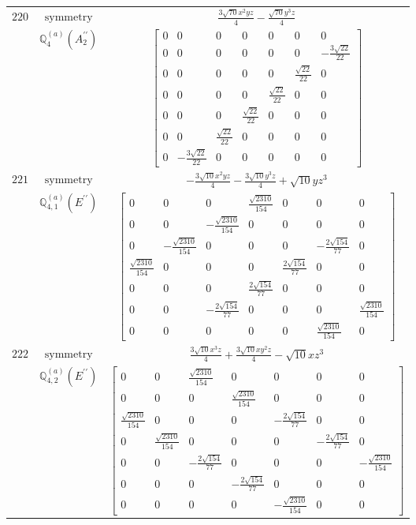 \documentclass[fleqn,8pt,landscape]{jsarticle}
\begin{document}
\begin{longtable}{ccc}
$ 220 $ & $ \text{symmetry} $ & $ \frac{3 \sqrt{70} x^{2} y z}{4} - \frac{\sqrt{70} y^{3} z}{4} $ \\
$  $ & $ \mathbb{Q}_{4}^{(a)}(A_{2}^{\prime\prime}) $ & $ \begin{bmatrix} 0 & 0 & 0 & 0 & 0 & 0 & 0 \\ 0 & 0 & 0 & 0 & 0 & 0 & - \frac{3 \sqrt{22}}{22} \\ 0 & 0 & 0 & 0 & 0 & \frac{\sqrt{22}}{22} & 0 \\ 0 & 0 & 0 & 0 & \frac{\sqrt{22}}{22} & 0 & 0 \\ 0 & 0 & 0 & \frac{\sqrt{22}}{22} & 0 & 0 & 0 \\ 0 & 0 & \frac{\sqrt{22}}{22} & 0 & 0 & 0 & 0 \\ 0 & - \frac{3 \sqrt{22}}{22} & 0 & 0 & 0 & 0 & 0 \end{bmatrix} $ \\ \hline
$ 221 $ & $ \text{symmetry} $ & $ - \frac{3 \sqrt{10} x^{2} y z}{4} - \frac{3 \sqrt{10} y^{3} z}{4} + \sqrt{10} y z^{3} $ \\
$  $ & $ \mathbb{Q}_{4,1}^{(a)}(E^{\prime\prime}) $ & $ \begin{bmatrix} 0 & 0 & 0 & \frac{\sqrt{2310}}{154} & 0 & 0 & 0 \\ 0 & 0 & - \frac{\sqrt{2310}}{154} & 0 & 0 & 0 & 0 \\ 0 & - \frac{\sqrt{2310}}{154} & 0 & 0 & 0 & - \frac{2 \sqrt{154}}{77} & 0 \\ \frac{\sqrt{2310}}{154} & 0 & 0 & 0 & \frac{2 \sqrt{154}}{77} & 0 & 0 \\ 0 & 0 & 0 & \frac{2 \sqrt{154}}{77} & 0 & 0 & 0 \\ 0 & 0 & - \frac{2 \sqrt{154}}{77} & 0 & 0 & 0 & \frac{\sqrt{2310}}{154} \\ 0 & 0 & 0 & 0 & 0 & \frac{\sqrt{2310}}{154} & 0 \end{bmatrix} $ \\ \hline
$ 222 $ & $ \text{symmetry} $ & $ \frac{3 \sqrt{10} x^{3} z}{4} + \frac{3 \sqrt{10} x y^{2} z}{4} - \sqrt{10} x z^{3} $ \\
$  $ & $ \mathbb{Q}_{4,2}^{(a)}(E^{\prime\prime}) $ & $ \begin{bmatrix} 0 & 0 & \frac{\sqrt{2310}}{154} & 0 & 0 & 0 & 0 \\ 0 & 0 & 0 & \frac{\sqrt{2310}}{154} & 0 & 0 & 0 \\ \frac{\sqrt{2310}}{154} & 0 & 0 & 0 & - \frac{2 \sqrt{154}}{77} & 0 & 0 \\ 0 & \frac{\sqrt{2310}}{154} & 0 & 0 & 0 & - \frac{2 \sqrt{154}}{77} & 0 \\ 0 & 0 & - \frac{2 \sqrt{154}}{77} & 0 & 0 & 0 & - \frac{\sqrt{2310}}{154} \\ 0 & 0 & 0 & - \frac{2 \sqrt{154}}{77} & 0 & 0 & 0 \\ 0 & 0 & 0 & 0 & - \frac{\sqrt{2310}}{154} & 0 & 0 \end{bmatrix} $ \\ \hline

\end{longtable}
\end{document}
